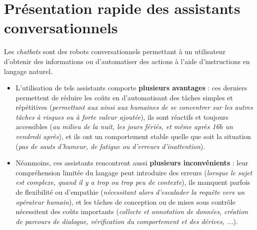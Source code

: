 	\minitoc
	

	\newpage
	\section{Présentation rapide des assistants conversationnels}
	\label{annex:B.1-ANNEXE-CHATBOTS-PRESENTATION}
	
		Les \textit{chatbots} sont des robots conversationnels permettant à un utilisateur d'obtenir des informations ou d'automatiser des actions à l'aide d'instructions en langage naturel.
		\begin{itemize}
			\item[\faThumbsUp] L'utilisation de tels assistants comporte \textbf{plusieurs avantages} :
			ces derniers permettent de réduire les coûts en d'automatisant des tâches simples et répétitives (\textit{permettant aux ainsi aux humaines de se concentrer sur les autres tâches à risques ou à forte valeur ajoutée}),
			ils sont réactifs et toujours accessibles (\textit{au milieu de la nuit, les jours fériés, et même après 16h un vendredi après}),
			et ils ont un comportement stable quelle que soit la situation (\textit{pas de sauts d'humeur, de fatigue ou d'erreurs d'inattention}).
			\item[\faThumbsDown] Néanmoins, ces assistants rencontrent aussi \textbf{plusieurs inconvénients} :
			leur compréhension limitée du langage peut introduire des erreurs (\textit{lorsque le sujet est complexe, quand il y a trop ou trop peu de contexte}),
			ils manquent parfois de flexibilité ou d'empathie (\textit{nécessitant alors d'escalader la requête vers un opérateur humain}),
			et les tâches de conception ou de mises sous contrôle nécessitent des coûts importants (\textit{collecte et annotation de données, création de parcours de dialogue, vérification du comportement et des dérives, ...}).
		\end{itemize}
		
